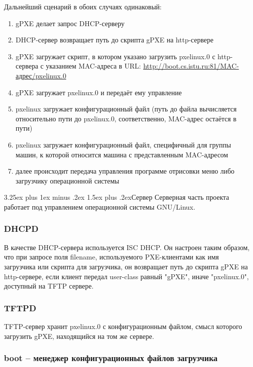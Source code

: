 \documentclass[11pt]{article}
\makeatletter
\renewcommand{\subsection}{\@startsection{subsection}{2}%
{\parindent}{3.25ex plus 1ex minus .2ex}%
{1.5ex plus .2ex}{\bfseries}}
\makeatother
\begin{document}
Дальнейший сценарий в обоих случаях одинаковый:
\begin{enumerate}
    \item gPXE делает запрос DHCP-серверу
    \item DHCP-сервер возвращает путь до скрипта gPXE на http-сервере
    \item gPXE загружает скрипт, в котором указано загрузить pxelinux.0
        с http-сервера с указанием MAC-адреса в URL:
        \url{http://boot.cs.istu.ru:81/MAC-адрес/pxelinux.0}
    \item gPXE загружает pxelinux.0 и передаёт ему управление
    \item pxelinux загружает конфигурационный файл (путь до файла
        вычисляется относительно пути до pxelinux.0,
        соответственно, MAC-адрес остаётся в пути)
    \item pxelinux загружает конфигурационный файл,
        специфичный для группы машин, к которой относится машина
        с представленным MAC-адресом
    \item далее происходит передача управления программе отрисовки
        меню либо загрузчику операционной системы
\end{enumerate}

\subsection{Сервер}
Серверная часть проекта работает под управлением операционной
системы GNU/Linux.

\subsubsection{DHCPD}
В качестве DHCP-сервера используется ISC DHCP.
Он настроен таким образом, что при запросе поля
filename, используемого PXE-клиентами как имя
загрузчика или скрипта для загрузчика,
он возвращает путь до скрипта gPXE на http-сервере,
если клиент передал user-class равный "gPXE",
иначе "pxelinux.0", доступный на TFTP сервере.

\subsubsection{TFTPD}
TFTP-сервер хранит pxelinux.0 с конфигурационным
файлом, смысл которого загрузить gPXE, находящийся
на том же сервере.

\subsubsection{boot -- менеджер конфигурационных файлов загрузчика}
\end{document}
